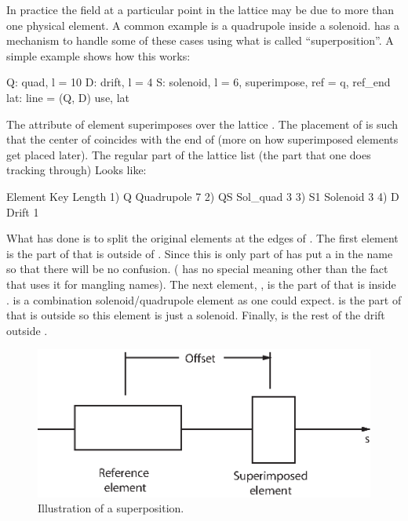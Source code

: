 In practice the field at a particular point in the lattice may be due
to more than one physical element. A common example is a quadrupole
inside a solenoid. \bmad has a mechanism to handle some of these
cases using what is called ``superposition''. A simple example shows
how this works:
\begin{example}
  Q: quad, l = 10
  D: drift, l = 4
  S: solenoid, l = 6, superimpose, ref = q, ref_end
  lat: line = (Q, D)
  use, lat
\end{example}
The  attribute of element  superimposes 
over the lattice . The placement of  is such that the
center of  coincides with the end of  (more on how
superimposed elements get placed later). The regular part of the
lattice list (the part that one does tracking through) Looks like:
\begin{example}
        Element   Key         Length
  1)    Q{\B}        Quadrupole   7
  2)    Q{\B}S       Sol_quad     3
  3)    S{\B}1       Solenoid     3
  4)    D{\B}        Drift        1
\end{example}
What \bmad has done is to split the original elements  at
the edges of .  The first element  is the part of 
that is outside of . Since this is only part of  \bmad
has put a \vn{\B} in the name so that there will be no confusion.
(\vn{\B} has no special meaning other than the fact that \bmad uses
it for mangling names). The next element, , is the part of
 that is inside .  is a combination
solenoid/quadrupole element as one could expect.  is the part
of  that is outside  so this element is just a
solenoid. Finally,  is the rest of the drift outside .

\begin{figure}
\centering 
\includegraphics{superimpose.eps} 
\caption[Superposition Illustration.]
{Illustration of a superposition.}
\label{f:superimpose}
\end{figure}

